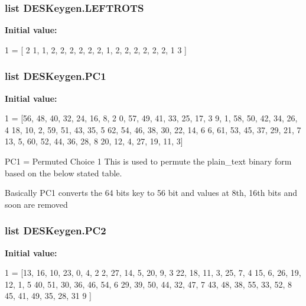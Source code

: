 \subsubsection[{\texorpdfstring{L\+E\+F\+T\+R\+O\+TS}{LEFTROTS}}]{\setlength{\rightskip}{0pt plus 5cm}list D\+E\+S\+Keygen.\+L\+E\+F\+T\+R\+O\+TS}\hypertarget{namespaceDESKeygen_a5f5d5fb8cd62da6f74e19f8c1c22a611}{}\label{namespaceDESKeygen_a5f5d5fb8cd62da6f74e19f8c1c22a611}
{\bfseries Initial value\+:}
\begin{DoxyCode}
1 = [
2     1, 1, 2, 2, 2, 2, 2, 2, 1, 2, 2, 2, 2, 2, 2, 1
3 ]
\end{DoxyCode}
\subsubsection[{\texorpdfstring{P\+C1}{PC1}}]{\setlength{\rightskip}{0pt plus 5cm}list D\+E\+S\+Keygen.\+P\+C1}\hypertarget{namespaceDESKeygen_ad9fa6cbd0839d08d29221becb47ac2ba}{}\label{namespaceDESKeygen_ad9fa6cbd0839d08d29221becb47ac2ba}
{\bfseries Initial value\+:}
\begin{DoxyCode}
1 = [56, 48, 40, 32, 24, 16, 8,
2        0, 57, 49, 41, 33, 25, 17,
3        9, 1, 58, 50, 42, 34, 26,
4        18, 10, 2, 59, 51, 43, 35,
5        62, 54, 46, 38, 30, 22, 14,
6        6, 61, 53, 45, 37, 29, 21,
7        13, 5, 60, 52, 44, 36, 28,
8        20, 12, 4, 27, 19, 11, 3]
\end{DoxyCode}


P\+C1 = Permuted Choice 1 This is used to permute the plain\+\_\+text binary form based on the below stated table. 

Basically P\+C1 converts the 64 bits key to 56 bit and values at 8th, 16th bits and soon are removed 
\subsubsection[{\texorpdfstring{P\+C2}{PC2}}]{\setlength{\rightskip}{0pt plus 5cm}list D\+E\+S\+Keygen.\+P\+C2}\hypertarget{namespaceDESKeygen_aaa16a1cab6f290096983471082d523aa}{}\label{namespaceDESKeygen_aaa16a1cab6f290096983471082d523aa}
{\bfseries Initial value\+:}
\begin{DoxyCode}
1 = [13, 16, 10, 23, 0, 4,
2        2, 27, 14, 5, 20, 9,
3        22, 18, 11, 3, 25, 7,
4        15, 6, 26, 19, 12, 1,
5        40, 51, 30, 36, 46, 54,
6        29, 39, 50, 44, 32, 47,
7        43, 48, 38, 55, 33, 52,
8        45, 41, 49, 35, 28, 31
9        ]
\end{DoxyCode}



